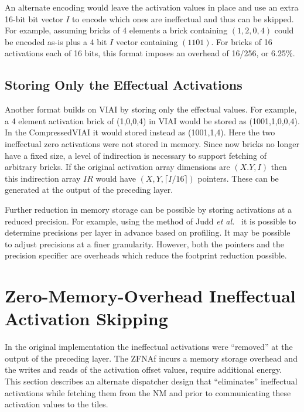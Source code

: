 An alternate encoding would leave the activation values in place and  use an extra 16-bit bit vector $I$ to encode which ones are ineffectual and thus can be skipped. For example, assuming bricks of 4 elements a brick containing $(1, 2, 0, 4)$ could be encoded as-is plus a 4 bit  $I$ vector containing $(1101)$. For bricks of 16 activations each of 16 bits, this format imposes an overhead of 16/256, or 6.25\%.

\subsection{Storing Only the Effectual Activations}
 Another format builds on VIAI by storing only the effectual values. For example, a 4 element activation brick of (1,0,0,4) in VIAI would be stored as (1001,1,0,0,4). In the CompressedVIAI it would stored instead as (1001,1,4). Here the two ineffectual zero activations were not stored in memory. Since now bricks no longer have a fixed size, a level of indirection is necessary to support fetching of arbitrary bricks. If the original activation array dimensions are $(X.Y,I)$ then this indirection array $IR$  would have $(X,Y,\lceil I/16\rceil)$ pointers. These can be generated at the output of the preceding layer. 
 
 Further reduction in memory storage can be possible by storing activations at a reduced precision. For example, using the method of Judd \textit{et al.}~\cite{judd:reduced} it is possible to determine precisions per layer in advance based on profiling. 
 It may be possible to adjust precisions at a finer granularity. However, both the pointers and the precision specifier are overheads which reduce the footprint reduction possible.
 
\section{Zero-Memory-Overhead Ineffectual Activation Skipping}

In the original \ZF  implementation the ineffectual activations were ``removed'' at the output of the preceding layer. The ZFNAf incurs a memory storage overhead and the writes and reads of the activation offset values, require additional energy. This section describes an alternate dispatcher design that ``eliminates'' ineffectual activations while fetching them from the NM and prior to communicating these activation values to the tiles.

